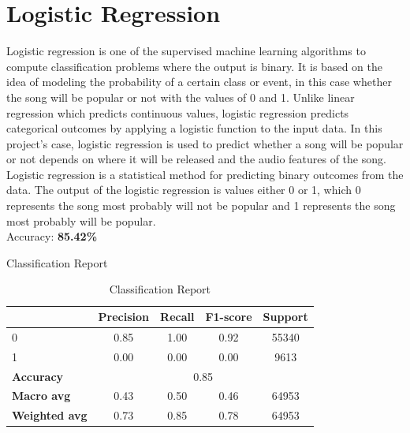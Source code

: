\newpage


\section{Logistic Regression}
Logistic regression is one of the supervised machine learning algorithms to
compute classification problems where the output is binary.
It is based on the idea of modeling the probability of a certain class or event, in this case whether the song will be popular or not with the values of 0 and 1.
Unlike linear regression which predicts continuous values, logistic regression predicts categorical outcomes by applying a logistic function to the input data.
In this project's case, logistic regression is used to predict
whether a song will be popular or not depends on where it will be released and the 
audio features of the song. Logistic regression is a statistical method for 
predicting binary outcomes from the data. The output of the logistic regression is values
either 0 or 1, which 0 represents the song most probably will not be popular and 
1 represents the song most probably will be popular. \\



Accuracy: \textbf{85.42\%}


Classification Report
\begin{table}[h]
    \centering
    \begin{tabular}{lcccc}
        \toprule
        & \textbf{Precision} & \textbf{Recall} & \textbf{F1-score} & \textbf{Support} \\
        \midrule
        0 & 0.85 & 1.00 & 0.92 & 55340 \\
        1 & 0.00 & 0.00 & 0.00 & 9613 \\
        \midrule
        \textbf{Accuracy} & \multicolumn{4}{c}{0.85} \\
        \textbf{Macro avg} & 0.43 & 0.50 & 0.46 & 64953 \\
        \textbf{Weighted avg} & 0.73 & 0.85 & 0.78 & 64953 \\
        \bottomrule
    \end{tabular}
    \caption{Classification Report}
    \label{tab:classification_report}
\end{table}

